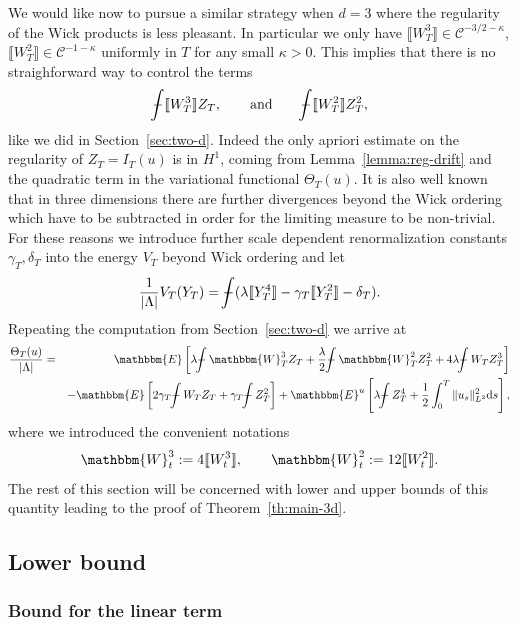 \documentclass[11pt, oneside]{article}   	%
\newcommand{\assign}{:=}
\newcommand{\mathd}{\mathrm{d}}
\def\Xint#1{\mathchoice
{\XXint\displaystyle\textstyle{#1}}%
{\XXint\textstyle\scriptstyle{#1}}%
{\XXint\scriptstyle\scriptscriptstyle{#1}}%
{\XXint\scriptscriptstyle\scriptscriptstyle{#1}}%
\!\int}
\def\XXint#1#2#3{{\setbox0=\hbox{$#1{#2#3}{\int}$ }
\vcenter{\hbox{$#2#3$ }}\kern-.6\wd0}}
\def\dashint{\Xint-}
\newcommand{\bint}{\dashint}
\newcommand{\VV}{\mathscr{C}}
\begin{document}
We would like now to pursue a similar strategy when $d = 3$ where the
regularity of the Wick products is less pleasant. In particular we only have
$\llbracket W_T^3 \rrbracket \in \VV^{- 3 / 2 - \kappa}$, $\llbracket W_T^2
\rrbracket \in \VV^{- 1 - \kappa}$ uniformly in $T$ for any small $\kappa >
0$. This implies that there is no straighforward way to control the terms
\begin{equation}
  \bint \llbracket W_T^3 \rrbracket Z_T, \qquad \text{and} \qquad \bint
  \llbracket W_T^2 \rrbracket Z_T^2, \label{eq:mixed-terms}
\end{equation}
like we did in Section~\ref{sec:two-d}. Indeed the only apriori estimate on
the regularity of $Z_T = I_T (u)$ is in $H^1$, coming from
Lemma~\ref{lemma:reg-drift} and the quadratic term in the variational
functional $\Theta_T (u)$. It is also well known that in three dimensions
there are further divergences beyond the Wick ordering which have to be
subtracted in order for the limiting measure to be non-trivial. For these
reasons we introduce further scale dependent renormalization constants
$\gamma_T, \delta_T$ into the energy $V_T$ beyond Wick ordering and let
\[ \frac{1}{| \Lambda |} V_T (Y_T) = \bint (\lambda \llbracket Y_T^4
   \rrbracket - \gamma_T \llbracket Y_T^2 \rrbracket - \delta_T) . \]
Repeating the computation from Section~\ref{sec:two-d} we arrive at
\begin{eqnarray*}
  \frac{\Theta_T (u)}{| \Lambda |} & = & \mathbbm{E} \left[ \lambda \bint
  \mathbbm{W}_T^3 Z_T + \frac{\lambda}{2} \bint \mathbbm{W}^2_T Z_T^2 + 4
  \lambda \bint W_T Z_T^3 \right]\\
  &  & -\mathbbm{E} \left[ 2 \gamma_T \bint W_T Z_T + \gamma_T \bint
  Z_T^2 \right] +\mathbbm{E}^u \left[ \lambda \bint Z_T^4 + \frac{1}{2}
  \int_0^T \| u_s \|^2_{L^2} \mathd s \right],
\end{eqnarray*}
where we introduced the convenient notations
\[ \mathbbm{W}_t^3 \assign 4 \llbracket W_t^3 \rrbracket, \qquad
   \mathbbm{W}^2_t \assign 12 \llbracket W_t^2 \rrbracket . \]
The rest of this section will be concerned with lower and upper bounds of this
quantity leading to the proof of Theorem~\ref{th:main-3d}.

\subsection{Lower bound}

\subsubsection{Bound for the linear term}
\end{document}
